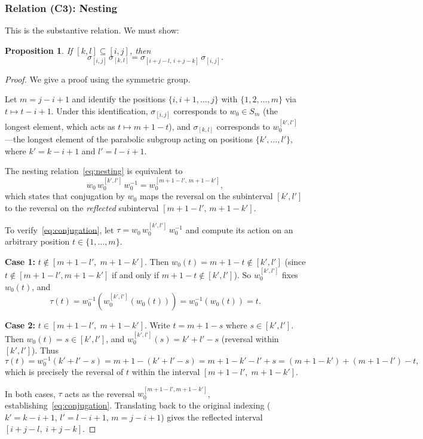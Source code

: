\documentclass[11pt]{article}
\newtheorem{proposition}[theorem]{Proposition}
\theoremstyle{remark}
\begin{document}
\subsubsection*{Relation (C3): Nesting}

This is the substantive relation. We must show:

\begin{proposition}\label{prop:nesting}
If $[k,l] \subseteq [i,j]$, then
\begin{equation}\label{eq:nesting}
  \sigma_{[i,j]}\, \sigma_{[k,l]} = \sigma_{[i+j-l,\, i+j-k]}\, \sigma_{[i,j]}.
\end{equation}
\end{proposition}

\begin{proof}
We give a proof using the symmetric group.

Let $m = j - i + 1$ and identify the positions $\{i, i+1, \ldots, j\}$ with
$\{1, 2, \ldots, m\}$ via $t \mapsto t - i + 1$. Under this identification,
$\sigma_{[i,j]}$ corresponds to $w_0 \in S_m$ (the longest element, which
acts as $t \mapsto m + 1 - t$), and $\sigma_{[k,l]}$ corresponds to
$w_0^{[k',l']}$---the longest element of the parabolic subgroup acting on
positions $\{k', \ldots, l'\}$, where $k' = k - i + 1$ and $l' = l - i + 1$.

The nesting relation~\eqref{eq:nesting} is equivalent to
\begin{equation}\label{eq:conjugation}
  w_0\, w_0^{[k',l']}\, w_0^{-1} = w_0^{[m+1-l',\, m+1-k']},
\end{equation}
which states that conjugation by $w_0$ maps the reversal on the subinterval
$[k', l']$ to the reversal on the \emph{reflected} subinterval
$[m + 1 - l',\, m + 1 - k']$.

To verify~\eqref{eq:conjugation}, let $\tau = w_0\, w_0^{[k',l']}\, w_0^{-1}$
and compute its action on an arbitrary position $t \in \{1, \ldots, m\}$.

\textbf{Case 1:} $t \notin [m + 1 - l',\; m + 1 - k']$.
Then $w_0(t) = m + 1 - t \notin [k', l']$ (since $t \notin [m+1-l', m+1-k']$
if and only if $m+1-t \notin [k', l']$). So $w_0^{[k',l']}$ fixes $w_0(t)$,
and
\[
  \tau(t) = w_0^{-1}(w_0^{[k',l']}(w_0(t))) = w_0^{-1}(w_0(t)) = t.
\]

\textbf{Case 2:} $t \in [m + 1 - l',\; m + 1 - k']$.
Write $t = m + 1 - s$ where $s \in [k', l']$. Then $w_0(t) = s \in [k', l']$,
and $w_0^{[k',l']}(s) = k' + l' - s$ (reversal within $[k', l']$). Thus
\[
  \tau(t) = w_0^{-1}(k' + l' - s) = m + 1 - (k' + l' - s)
  = m + 1 - k' - l' + s = (m + 1 - k') + (m + 1 - l') - t,
\]
which is precisely the reversal of $t$ within the interval
$[m + 1 - l',\; m + 1 - k']$.

In both cases, $\tau$ acts as the reversal $w_0^{[m+1-l', m+1-k']}$,
establishing~\eqref{eq:conjugation}. Translating back to the original
indexing ($k' = k - i + 1$, $l' = l - i + 1$, $m = j - i + 1$) gives
the reflected interval $[i + j - l,\; i + j - k]$.
\end{proof}
\end{document}
